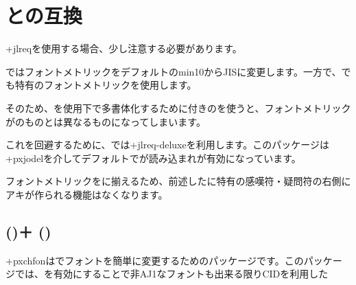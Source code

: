 \documentclass[../otf-unofficial-guide]{subfiles}
\begin{document}
\section{\texorpdfstring{}{jlreq}との互換}

\cls+{jlreq}を使用する場合、少し注意する必要があります。

ではフォントメトリックを{\pLaTeX}デフォルトのmin10からJISに変更します。一方で、でも特有のフォントメトリックを使用します。

そのため、を使用下で多書体化するために付きのを使うと、フォントメトリックがのものとは異なるものになってしまいます。

これを回避するために、では\pkg+{jlreq-deluxe}を利用します。このパッケージは\pkg+{pxjodel}を介してデフォルトでが読み込まれが有効になっています。


フォントメトリックをに揃えるため、前述したに特有の感嘆符・疑問符の右側にアキが作られる機能はなくなります。

\subsection{\texorpdfstring{ ()＋ ()}{jlreq (deluxe)＋pxchfon (unicode)}}

\pkg+{pxchfon}は{\upLaTeX*}でフォントを簡単に変更するためのパッケージです。このパッケージでは、を有効にすることで非AJ1なフォントも出来る限りCIDを利用した
\end{document}
